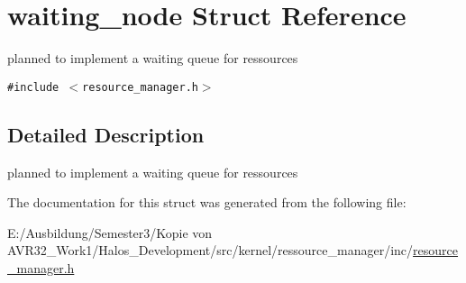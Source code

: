 \hypertarget{structwaiting__node}{
\section{waiting\_\-node Struct Reference}
\label{structwaiting__node}
}
planned to implement a waiting queue for ressources  


{\tt \#include $<$resource\_\-manager.h$>$}



\subsection{Detailed Description}
planned to implement a waiting queue for ressources 

The documentation for this struct was generated from the following file:\begin{CompactItemize}
\item 
E:/Ausbildung/Semester3/Kopie von AVR32\_\-Work1/Halos\_\-Development/src/kernel/ressource\_\-manager/inc/\hyperlink{resource__manager_8h}{resource\_\-manager.h}\end{CompactItemize}
